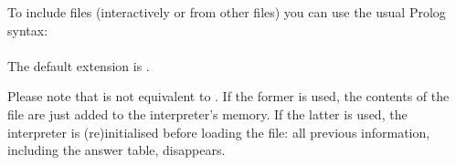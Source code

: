 
To include files (interactively or from other files) you can use the usual
Prolog syntax:\\
\ind
{}\\
The default extension is .%
%

Please note that  is not equivalent to
. If the former is used, the contents of the file
are just added to the interpreter's memory. If the latter is used, the
interpreter is (re)initialised before loading the file: all previous
information, including the answer table, disappears.

%
